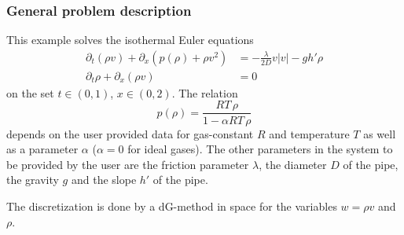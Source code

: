 \subsubsection{General problem description}
This example solves the isothermal Euler equations
\begin{align*}
 \partial_t(\rho v) + \partial_x (p(\rho)+ \rho v^2) &= - \frac{\lambda}{2D} v|v| - gh' \rho\\
 \partial_t \rho + \partial_x (\rho v) &=0
\end{align*}
on the set $t \in (0,1)$, $x \in (0,2)$.
The relation 
\[
p(\rho) = \frac{RT\, \rho}{1-\alpha RT\,\rho}
\]
depends on the user provided data for gas-constant $R$ and temperature $T$ as well as a parameter 
$\alpha$ ($\alpha = 0$ for ideal gases).
The other parameters in the system to be provided by the user are 
the friction parameter $\lambda$, the diameter $D$ of the pipe, the gravity $g$ and the slope $h'$ of the 
pipe. 

The discretization is done by a dG-method in space for the variables 
$w = \rho v$ and $\rho$.
